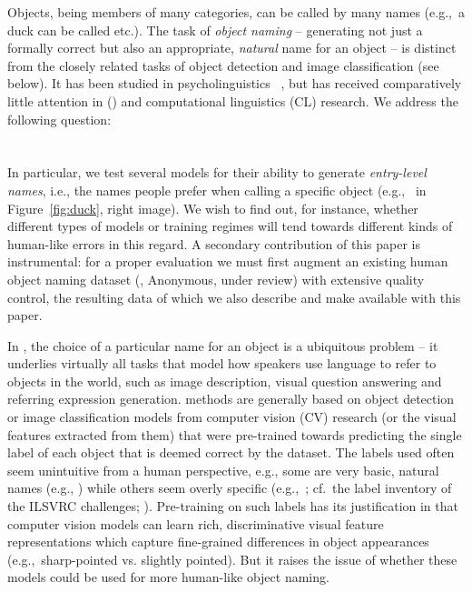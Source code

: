 Objects, being members of many categories, can be called by many names (e.g.,\ a duck can be called  etc.). 
The task of \emph{object naming} -- generating not just a formally correct but also an appropriate, \emph{natural} name for an object -- is distinct from the closely related tasks of object detection and image classification (see below).
It has been studied in psycholinguistics~\cite{refs} , but has received comparatively little attention in \langvis (\lv) and computational linguistics (CL) research.
We address the following question:\\
\\\\
In particular, we test several models for their ability to generate \emph{entry-level names}, i.e., the names people prefer when calling a specific object (e.g.,~ in Figure~\ref{fig:duck}, right image).
We wish to find out, for instance, whether different types of models or training regimes will tend towards different kinds of human-like errors in this regard.
A secondary contribution of this paper is instrumental: for a proper evaluation we must first augment an existing human object naming dataset (\mn, Anonymous, under review) with extensive quality control, the resulting data of which we also describe and make available with this paper.

In \lv, the choice of a particular name for an object is a ubiquitous problem -- it underlies virtually all tasks that model how speakers use language to refer to objects in the world, such as image description, visual question answering and referring expression generation.
\lv methods are generally based on object detection or image classification models from computer vision (CV) research (or the visual features extracted from them) that were pre-trained towards predicting the single label of each object that is deemed correct by the dataset.
The labels used often seem unintuitive from a human perspective, e.g., some are very basic, natural names (e.g., ) while others seem overly specific (e.g.,\ ; cf.\ the label inventory of the ILSVRC challenges; \citealt{ILSVRC15}).
Pre-training on such labels has its justification in that computer vision models can learn rich, discriminative visual feature representations which capture fine-grained differences in object appearances (e.g.,\ sharp-pointed vs. slightly pointed). 
But it raises the issue of whether these models could be used for more human-like object naming.

